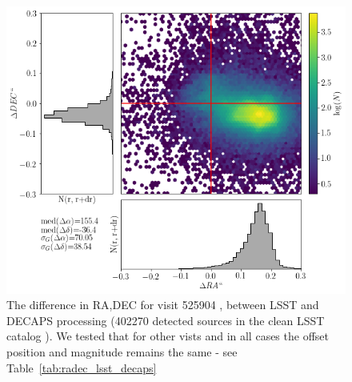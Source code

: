 \documentclass[DM,lsstdraft,toc,usenatbib]{lsstdoc}
\begin{document}
\begin{figure}
\begin{centering}
\includegraphics[width=0.8\columnwidth]{figs/22_525904_RA_DEC_offset.png}
\caption{The difference in RA,DEC for visit 525904 , between LSST and DECAPS processing (402270 detected sources in  the clean LSST catalog ). We tested that for other vists and in all cases the offset position and magnitude remains the same - see Table~\ref{tab:radec_lsst_decaps}}
\label{fig:ra_dec_lsst_decaps}
\end{centering}
\end{figure} 
\end{document}
